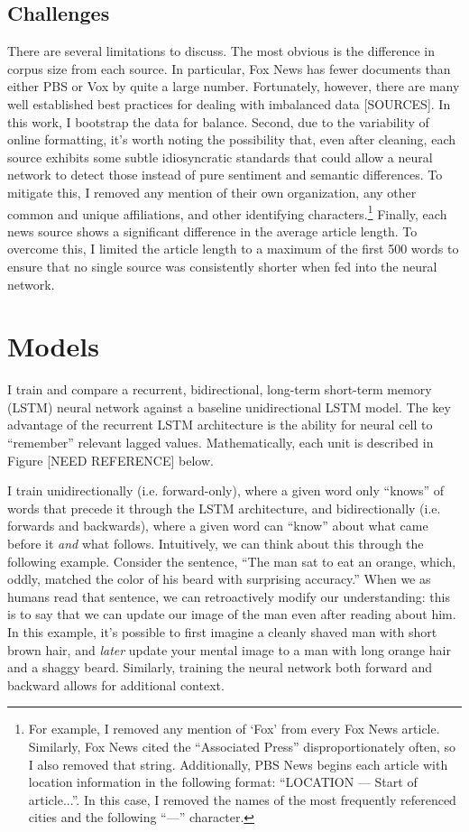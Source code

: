 \documentclass{article}
\begin{document}
	\subsection{Challenges}
	    There are several limitations to discuss. The most obvious is the difference in corpus size from each source. In particular, Fox News has fewer documents than either PBS or Vox by quite a large number. Fortunately, however, there are many well established best practices for dealing with imbalanced data [SOURCES]. In this work, I bootstrap the data for balance. Second, due to the variability of online formatting, it's worth noting the possibility that, even after cleaning, each source exhibits some subtle idiosyncratic standards that could allow a neural network to detect those instead of pure sentiment and semantic differences. To mitigate this, I removed any mention of their own organization, any other common and unique affiliations, and other identifying characters.\footnote{For example, I removed any mention of `Fox' from every Fox News article. Similarly, Fox News cited the ``Associated Press'' disproportionately often, so I also removed that string. Additionally, PBS News begins each article with location information in the following format: ``LOCATION --- Start of article...''. In this case, I removed the names of the most frequently referenced cities and the following ``---'' character.} Finally, each news source shows a significant difference in the average article length. To overcome this, I limited the article length to a maximum of the first 500 words to ensure that no single source was consistently shorter when fed into the neural network. 
	    	
	\section{Models}
	I train and compare a recurrent, bidirectional, long-term short-term memory (LSTM) neural network against a baseline unidirectional LSTM model. The key advantage of the recurrent LSTM architecture is the ability for neural cell to ``remember'' relevant lagged values. Mathematically, each unit is described in Figure [NEED REFERENCE] below.  
	
	
	I train unidirectionally (i.e. forward-only), where a given word only ``knows'' of words that precede it through the LSTM architecture, and bidirectionally (i.e. forwards and backwards), where a given word can ``know'' about what came before it \textit{and} what follows. Intuitively, we can think about this through the following example. Consider the sentence, ``The man sat to eat an orange, which, oddly, matched the color of his beard with surprising accuracy.'' When we as humans read that sentence, we can retroactively modify our understanding: this is to say that we can update our image of the man even after reading about him. In this example, it's possible to first imagine a cleanly shaved man with short brown hair, and \textit{later} update your mental image to a man with long orange hair and a shaggy beard. Similarly, training the neural network both forward and backward allows for additional context. 
	
\end{document}
